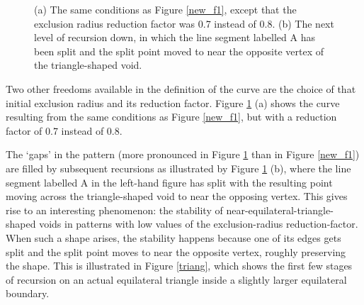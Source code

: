 \documentclass[12pt]{article}
\begin{document}
\begin{figure}[h!]
\begin{center}
  \parbox{110mm}{\caption{\label{new_f07} (a) The same conditions as Figure
  \ref{new_f1}, except that the exclusion radius reduction factor was
  0.7 instead of 0.8. (b) The next level of recursion down, in which
  the line segment labelled A has been split and the split point moved
  to near the opposite vertex of the triangle-shaped void.}}
\end{center}
\end{figure}

Two other freedoms available in the definition of the curve are the
choice of that initial exclusion radius and its reduction factor.
Figure \ref{new_f07} (a) shows the curve resulting from the same
conditions as Figure \ref{new_f1}, but with a reduction factor of 0.7
instead of 0.8.

The `gaps' in the pattern (more pronounced in Figure \ref{new_f07}
than in Figure \ref{new_f1}) are filled by subsequent recursions as
illustrated by Figure \ref{new_f07} (b), where the line segment
labelled A in the left-hand figure has split with the resulting point
moving across the triangle-shaped void to near the opposing vertex.
This gives rise to an interesting phenomenon: the stability of
near-equilateral-triangle-shaped voids in patterns with
low values of the exclusion-radius reduction-factor.  When such a
shape arises, the stability happens because one of its edges gets
split and the split point moves to near the opposite vertex, roughly
preserving the shape.  This is illustrated in Figure \ref{triang},
which shows the first few stages of recursion on an actual equilateral
triangle inside a slightly larger equilateral boundary.
\end{document}
